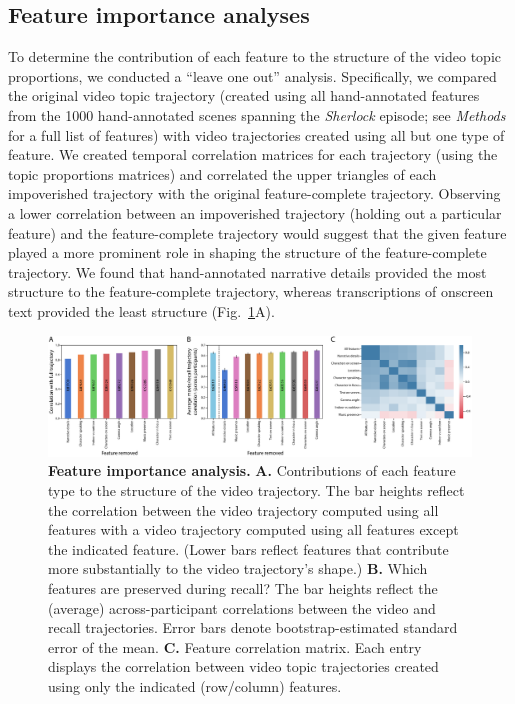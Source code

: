 \documentclass{article}
\begin{document}
\subsection*{Feature importance analyses}
To determine the contribution of each feature to the structure of the video topic proportions, we conducted a ``leave one out'' analysis.  Specifically, we compared the original video topic trajectory (created using all hand-annotated features from the 1000 hand-annotated scenes spanning the \textit{Sherlock} episode; see \textit{Methods} for a full list of features) with video trajectories created using all but one type of feature.  We created temporal correlation matrices for each trajectory (using the topic proportions matrices) and correlated the upper triangles of each impoverished trajectory with the original feature-complete trajectory.  Observing a lower correlation between an impoverished trajectory (holding out a particular feature) and the feature-complete trajectory would suggest that the given feature played a more prominent role in shaping the structure of the feature-complete trajectory.  We found that hand-annotated narrative details provided the most structure to the feature-complete trajectory, whereas transcriptions of onscreen text provided the least structure (Fig.~\ref{fig:feature-importance}A).

\begin{figure}[p!]
\centering
\includegraphics[width=1\textwidth]{figs/feature_value}
\caption{\small \textbf{Feature importance analysis.} \textbf{A.} Contributions of each feature type to the structure of the video trajectory. The bar heights reflect the correlation between the video trajectory computed using all features with a video trajectory computed using all features except the indicated feature.  (Lower bars reflect features that contribute more substantially to the video trajectory's shape.) \textbf{B.} Which features are preserved during recall?  The bar heights reflect the (average) across-participant correlations between the video and recall trajectories.  Error bars denote bootstrap-estimated standard error of the mean.  \textbf{C.} Feature correlation matrix.  Each entry displays the correlation between video topic trajectories created using only the indicated (row/column) features.}
\label{fig:feature-importance}
\end{figure}
\end{document}
